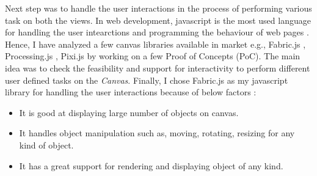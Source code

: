 \newline\newline Next step was to handle the user interactions in the process of performing various task on both the views. In web development, javascript is the most used language for handling the user intearctions and programming the behaviour of web pages \cite{javascript}. Hence, I have analyzed a few canvas libraries available in market e.g., Fabric.js \cite{fabricjs}, Processing.js \cite{processingjs}, Pixi.js \cite{pixijs}  by working on a few Proof of Concepts (PoC). The main idea was to check the feasibility and support for interactivity to perform different user defined tasks on the \textit{Canvas}. Finally, I chose Fabric.js as my javascript library for handling the user interactions because of below factors \cite{fabricjs}:
\begin{itemize}
	\item {It is good at displaying large number of objects on canvas.}
	\item {It handles object manipulation such as, moving, rotating, resizing for any kind of object.}
	\item {It has a great support for rendering and displaying object of any kind.}
\end{itemize}

